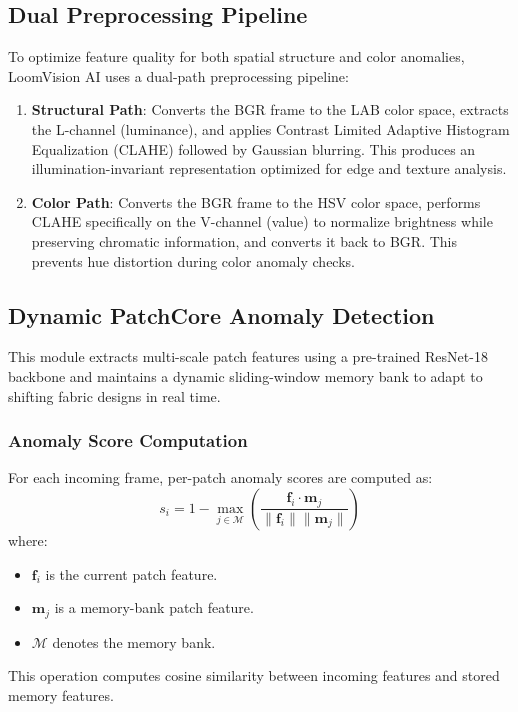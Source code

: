 \documentclass{ieeeaccess}
\begin{document}
\subsection{Dual Preprocessing Pipeline}
To optimize feature quality for both spatial structure and color anomalies, LoomVision AI uses a dual-path preprocessing pipeline:
\begin{enumerate}
    \item \textbf{Structural Path}: Converts the BGR frame to the LAB color space, extracts the L-channel (luminance), and applies Contrast Limited Adaptive Histogram Equalization (CLAHE) followed by Gaussian blurring. This produces an illumination-invariant representation optimized for edge and texture analysis.
    \item \textbf{Color Path}: Converts the BGR frame to the HSV color space, performs CLAHE specifically on the V-channel (value) to normalize brightness while preserving chromatic information, and converts it back to BGR. This prevents hue distortion during color anomaly checks.
\end{enumerate}

\subsection{Dynamic PatchCore Anomaly Detection}
This module extracts multi-scale patch features using a pre-trained ResNet-18 backbone and maintains a dynamic sliding-window memory bank to adapt to shifting fabric designs in real time.

\subsubsection{Anomaly Score Computation}
For each incoming frame, per-patch anomaly scores are computed as:
\begin{equation}
s_i = 1 - \max_{j \in \mathcal{M}} \left( \frac{\mathbf{f}_i \cdot \mathbf{m}_j}{\|\mathbf{f}_i\| \|\mathbf{m}_j\|} \right)
\label{eq:anomaly}
\end{equation}
where:
\begin{itemize}
    \item $\mathbf{f}_i$ is the current patch feature.
    \item $\mathbf{m}_j$ is a memory-bank patch feature.
    \item $\mathcal{M}$ denotes the memory bank.
\end{itemize}
This operation computes cosine similarity between incoming features and stored memory features.
\end{document}
